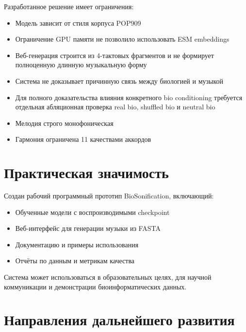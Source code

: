 Разработанное решение имеет ограничения:
\begin{itemize}
\item Модель зависит от стиля корпуса POP909
\item Ограничение GPU памяти не позволило использовать ESM embeddings
\item Веб-генерация строится из 4-тактовых фрагментов и не формирует полноценную длинную музыкальную форму
\item Система не доказывает причинную связь между биологией и музыкой
\item Для полного доказательства влияния конкретного bio conditioning требуется отдельная абляционная проверка real bio, shuffled bio и neutral bio
\item Мелодия строго монофоническая
\item Гармония ограничена 11 качествами аккордов
\end{itemize}

\section*{Практическая значимость}

Создан рабочий программный прототип BioSonification, включающий:
\begin{itemize}
\item Обученные модели с воспроизводимыми checkpoint
\item Веб-интерфейс для генерации музыки из FASTA
\item Документацию и примеры использования
\item Отчёты по данным и метрикам качества
\end{itemize}

Система может использоваться в образовательных целях, для научной коммуникации и демонстрации биоинформатических данных.

\section*{Направления дальнейшего развития}

